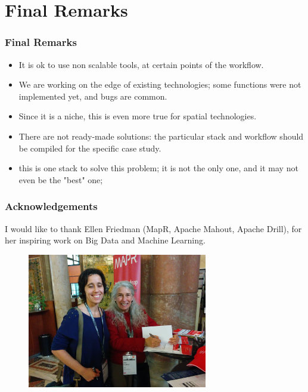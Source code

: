 \documentclass[hyperref={pdfpagelabels=true}]{beamer}
\begin{document}
\section{Final Remarks}
\begin{frame}
\frametitle{Final Remarks}
    \begin{itemize}    
      \item<2->It is ok to use non scalable tools, at certain points of the workflow.
      \item<3->We are working on the edge of existing technologies; some functions were not implemented yet, and bugs are common.
      \item<4->Since it is a niche, this is even more true for spatial technologies.
      \item<5->There are not ready-made solutions: the particular stack and workflow should be compiled for the specific case study.
      \item<6->this is one stack to solve this problem; it is not the only one, and it may not even be the "best" one;%
     \end{itemize}
\end{frame}


\begin{frame}
\frametitle{Acknowledgements}
I would like to thank Ellen Friedman (MapR, Apache Mahout, Apache Drill), for her inspiring work on Big Data and Machine Learning.
    \begin{figure}   
      \includegraphics[width=0.7\textwidth]{nosql_matters.jpg}      
    \end{figure}   
\end{frame}
\end{document}
